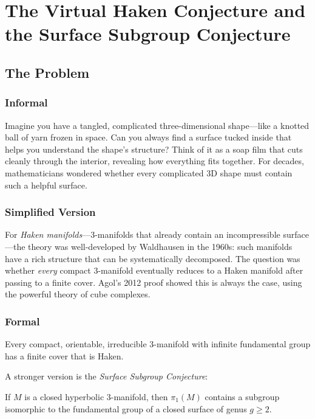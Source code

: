 \let\LocalMacro\relax

\chapter{The Virtual Haken Conjecture and the Surface Subgroup Conjecture}

\section{The Problem}

\subsection{Informal}
Imagine you have a tangled, complicated three-dimensional shape---like a knotted ball of yarn frozen in space. Can you always find a surface tucked inside that helps you understand the shape's structure? Think of it as a soap film that cuts cleanly through the interior, revealing how everything fits together. For decades, mathematicians wondered whether every complicated 3D shape must contain such a helpful surface.

\subsection{Simplified Version}
For \emph{Haken manifolds}---3-manifolds that already contain an incompressible surface---the theory was well-developed by Waldhausen in the 1960s: such manifolds have a rich structure that can be systematically decomposed. The question was whether \emph{every} compact 3-manifold eventually reduces to a Haken manifold after passing to a finite cover. Agol's 2012 proof showed this is always the case, using the powerful theory of cube complexes.

\subsection{Formal}
\begin{conjecture}
Every compact, orientable, irreducible 3-manifold with infinite fundamental group has a finite cover that is Haken.
\end{conjecture}

A stronger version is the \emph{Surface Subgroup Conjecture}:

\begin{conjecture}
If $M$ is a closed hyperbolic 3-manifold, then $\pi_1(M)$ contains a subgroup isomorphic to the fundamental group of a closed surface of genus $g \ge 2$.
\end{conjecture}

